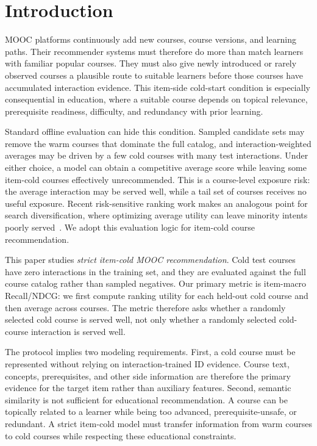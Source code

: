 \documentclass[sigconf,anonymous,review]{acmart}
\begin{document}
\section{Introduction}
MOOC platforms continuously add new courses, course versions, and learning paths. Their recommender systems must therefore do more than match learners with familiar popular courses. They must also give newly introduced or rarely observed courses a plausible route to suitable learners before those courses have accumulated interaction evidence. This item-side cold-start condition is especially consequential in education, where a suitable course depends on topical relevance, prerequisite readiness, difficulty, and redundancy with prior learning.

Standard offline evaluation can hide this condition. Sampled candidate sets may remove the warm courses that dominate the full catalog, and interaction-weighted averages may be driven by a few cold courses with many test interactions. Under either choice, a model can obtain a competitive average score while leaving some item-cold courses effectively unrecommended. This is a course-level exposure risk: the average interaction may be served well, while a tail set of courses receives no useful exposure. Recent risk-sensitive ranking work makes an analogous point for search diversification, where optimizing average utility can leave minority intents poorly served~\cite{takehi2025diversification}. We adopt this evaluation logic for item-cold course recommendation.

This paper studies \emph{strict item-cold MOOC recommendation}. Cold test courses have zero interactions in the training set, and they are evaluated against the full course catalog rather than sampled negatives. Our primary metric is item-macro Recall/NDCG: we first compute ranking utility for each held-out cold course and then average across courses. The metric therefore asks whether a randomly selected cold course is served well, not only whether a randomly selected cold-course interaction is served well.

The protocol implies two modeling requirements. First, a cold course must be represented without relying on interaction-trained ID evidence. Course text, concepts, prerequisites, and other side information are therefore the primary evidence for the target item rather than auxiliary features. Second, semantic similarity is not sufficient for educational recommendation. A course can be topically related to a learner while being too advanced, prerequisite-unsafe, or redundant. A strict item-cold model must transfer information from warm courses to cold courses while respecting these educational constraints.
\end{document}
